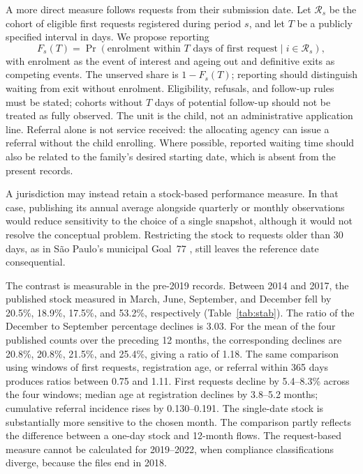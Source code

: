 A more direct measure follows requests from their submission date. Let $\mathcal{R}_s$ be the cohort of eligible first requests registered during period $s$, and let $T$ be a publicly specified interval in days. We propose reporting
\begin{equation}
F_s(T)=\Pr\!\left(\text{enrolment within }T\text{ days of first request}\mid i\in\mathcal{R}_s\right),
\label{eq:timely_enrollment}
\end{equation}
with enrolment as the event of interest and ageing out and definitive exits as competing events. The unserved share is $1-F_s(T)$; reporting should distinguish waiting from exit without enrolment. Eligibility, refusals, and follow-up rules must be stated; cohorts without $T$ days of potential follow-up should not be treated as fully observed. The unit is the child, not an administrative application line. Referral alone is not service received: the allocating agency can issue a referral without the child enrolling. Where possible, reported waiting time should also be related to the family's desired starting date, which is absent from the present records.

A jurisdiction may instead retain a stock-based performance measure. In that case, publishing its annual average alongside quarterly or monthly observations would reduce sensitivity to the choice of a single snapshot, although it would not resolve the conceptual problem. Restricting the stock to requests older than 30 days, as in S\~ao Paulo's municipal Goal~77 \citep{sme_metas2025}, still leaves the reference date consequential.

The contrast is measurable in the pre-2019 records. Between 2014 and 2017, the published stock measured in March, June, September, and December fell by 20.5\%, 18.9\%, 17.5\%, and 53.2\%, respectively (Table~\ref{tab:stab}). The ratio of the December to September percentage declines is 3.03. For the mean of the four published counts over the preceding 12 months, the corresponding declines are 20.8\%, 20.8\%, 21.5\%, and 25.4\%, giving a ratio of 1.18. The same comparison using windows of first requests, registration age, or referral within 365 days produces ratios between 0.75 and 1.11. First requests decline by 5.4--8.3\% across the four windows; median age at registration declines by 3.8--5.2 months; cumulative referral incidence rises by 0.130--0.191. The single-date stock is substantially more sensitive to the chosen month. The comparison partly reflects the difference between a one-day stock and 12-month flows. The request-based measure cannot be calculated for 2019--2022, when compliance classifications diverge, because the files end in 2018.

